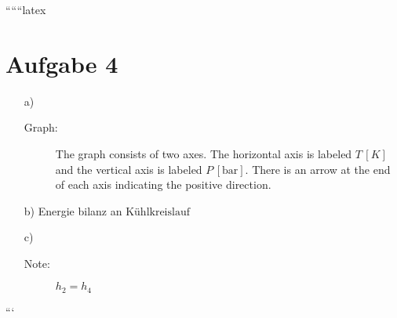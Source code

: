 
``````latex


\section*{Aufgabe 4}

\begin{itemize}
    \item[a)] 
    \begin{description}
        \item[Graph:] 
        The graph consists of two axes. The horizontal axis is labeled \( T \, [K] \) and the vertical axis is labeled \( P \, [\text{bar}] \). There is an arrow at the end of each axis indicating the positive direction.
    \end{description}
    
    \item[b)] Energie bilanz an \( \text{Kühlkreislauf} \)
    
    \item[c)] 
    \begin{description}
        \item[Note:] \( h_2 = h_4 \)
    \end{description}
\end{itemize}

```